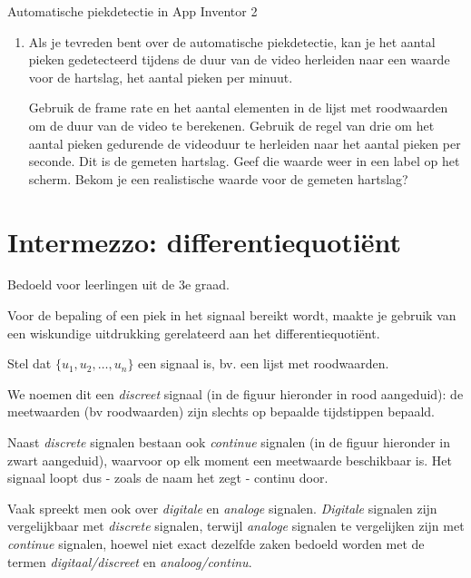\begin{opdracht}{Automatische piekdetectie in App Inventor 2}
\begin{enumerate}
	\begin{opmerking}
	We spreken hier over een aanvaardbaar resultaat en niet over een correct resultaat. Het is goed mogelijk dat het aantal pieken dat je code detecteert licht afwijkt van het aantal pieken dat jij telt. Hoe sterk de afwijking is, hangt af van de kwaliteit van de opgenomen video. In Module \ref{sec:digafbvid} gingen jullie al na welke factoren invloed hebben op de kwaliteit van de video.
	\end{opmerking}

	\item Als je tevreden bent over de automatische piekdetectie, kan je het aantal pieken gedetecteerd tijdens de duur van de video herleiden naar een waarde voor de hartslag, het aantal pieken per minuut.
	
	Gebruik de frame rate en het aantal elementen in de lijst met roodwaarden om de duur van de video te berekenen. Gebruik de regel van drie om het aantal pieken gedurende de videoduur te herleiden naar het aantal pieken per seconde. Dit is de gemeten hartslag. Geef die waarde weer in een label op het scherm. Bekom je een realistische waarde voor de gemeten hartslag?
\end{enumerate}
\end{opdracht}

\section{Intermezzo: differentiequoti\"ent}
\label{sec:Mod4_Sec2}
%
Bedoeld voor leerlingen uit de 3e graad.

Voor de bepaling of een piek in het signaal bereikt wordt, maakte je gebruik van een wiskundige uitdrukking gerelateerd aan het differentiequoti\"ent.

Stel dat $\{ u_1, u_2, \ldots, u_n\}$ een signaal is, bv. een lijst met roodwaarden. 

\begin{opmerking}
	We noemen dit een \emph{discreet} signaal (in de figuur hieronder in rood aangeduid): de meetwaarden (bv roodwaarden) zijn slechts op bepaalde tijdstippen bepaald. 
	
	Naast \emph{discrete} signalen bestaan ook \emph{continue} signalen (in de figuur hieronder in zwart aangeduid), waarvoor op elk moment een meetwaarde beschikbaar is. Het signaal loopt dus - zoals de naam het zegt - continu door.
	
	
	Vaak spreekt men ook over \emph{digitale} en \emph{analoge} signalen. \emph{Digitale} signalen zijn vergelijkbaar met \emph{discrete} signalen, terwijl \emph{analoge} signalen te vergelijken zijn met \emph{continue} signalen, hoewel niet exact dezelfde zaken bedoeld worden met de termen \emph{digitaal/discreet} en \emph{analoog/continu}.

\end{opmerking}

